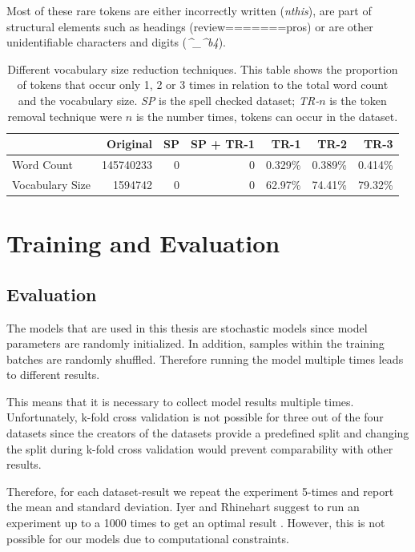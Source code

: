 Most of these rare tokens are either incorrectly written {(\textit{nthis})}, are part of structural elements such as headings {(review=======pros)} or are other unidentifiable characters and digits ({\textit{\^{}\_\^{}b4}}).
\begin{table}[]
	\centering
	\begin{tabular}{lrrrrrr}
			\toprule
			& Original  & SP & SP + TR-1 & TR-1 & TR-2 & TR-3 \\
			\midrule
			Word Count      & 145740233 & 0              & 0             & 0.329\%         & 0.389\%         & 0.414\%            \\
			Vocabulary Size & 1594742   & 0              & 0             & 62.97\%         & 74.41\%         & 79.32\%      \\  
			\bottomrule 	
	\end{tabular}

	\caption{Different vocabulary size reduction techniques. This table shows the proportion of tokens that occur only 1, 2 or 3 times in relation to the total word count and the vocabulary size. \textit{SP} is the spell checked dataset; \textit{TR-}$n$ is the token removal technique were $n$ is the number times, tokens can occur in the dataset.}
	\label{tab:05_amazonVocabSize}
\end{table}

\section{Training and Evaluation}
\label{sec:05_TrainingAndEvaluation}

\subsection{Evaluation}

The models that are used in this thesis are stochastic models since model parameters are randomly initialized. In addition, samples within the training batches are randomly shuffled. Therefore running the model multiple times leads to different results.

This means that it is necessary to collect model results multiple times. Unfortunately, k-fold cross validation is not possible for three out of the four datasets since the creators of the datasets provide a predefined split and changing the split during k-fold cross validation would prevent comparability with other results.

Therefore, for each dataset-result we repeat the experiment 5-times and report the mean and standard deviation. Iyer and Rhinehart suggest to run an experiment up to a 1000 times to get an optimal result \cite{Iyer1999}. However, this is not possible for our models due to computational constraints.

